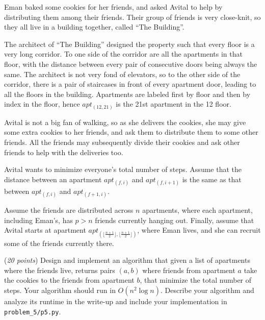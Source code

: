 \documentclass{hw_template}
\newcommand{\floor}[1]{\lfloor #1 \rfloor}
\begin{document}

\begin{problem}
  Eman baked some cookies for her friends, and asked Avital to help
  by distributing them among their friends. 
  Their group of friends is very close-knit, so they all live in a building 
  together, called ``The Building''.
  
  The architect of ``The Building'' designed 
  the property such that every floor is a very long corridor. To one side of 
  the corridor are all the apartments in that floor, with the distance between 
  every pair of consecutive doors being always the same.   
  The architect is not very fond of elevators, so to the other side of the 
  corridor, there is a pair of staircases in front of every apartment door,
  leading to all the floors in the building. 
  Apartments are labeled first by floor and then by index in the floor, hence 
  $apt_{(12,21)}$ is the 21st apartment in the 12 floor.

  Avital is not a big fan of walking, so as she delivers the cookies,
  she may give some extra cookies to her friends, and ask them to
  distribute them to some other friends. All the friends may subsequently
  divide their cookies and ask other friends to help with the deliveries too. 
  
  Avital wants to minimize everyone's total number of steps. Assume that the distance between an apartment $apt_{(f,i)}$ and $apt_{(f,i+1)}$ is the same as that between $apt_{(f,i)}$ and $apt_{(f+1,i)}$. 
  
  Assume the friends are distributed across $n$ apartments,
  where each apartment, including Eman's, has $p > n$ friends
  currently hanging out. 
  Finally, assume that Avital starts at apartment $apt_{(\floor{\frac{n+1}{2}},\floor{\frac{n+1}{2}})}$,
  where Eman lives, and she can recruit some of the friends currently there.

  (\textit{20 points}) Design and implement an algorithm that given a list of apartments where the friends live, returns pairs $(a, b)$ where friends from apartment $a$ take the cookies to the friends from apartment $b$, that minimize the total number of steps. Your algorithm should run in $O(n^2 \log n)$.
  Describe your algorithm and analyze its runtime in the write-up and include your implementation in \texttt{problem\_5/p5.py}.


\end{problem}
\end{document}
